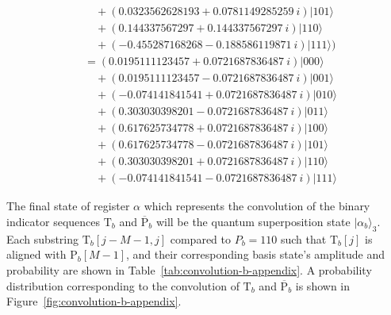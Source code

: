 \begin{example}
\begin{enumerate}
\begin{align*}
			& \quad + \left( 0.0323562628193 + 0.0781149285259\ i  \right) \vert 101 \rangle\\
			& \quad + \left( 0.144337567297 + 0.144337567297\ i \right) \vert 110 \rangle \\
			& \quad + \left( -0.455287168268 - 0.188586119871\ i \right) \vert 111 \rangle \Big)\\
			&= (0.0195111123457 + 0.0721687836487\ i ) \vert 000 \rangle \\
			& \quad + (0.0195111123457 - 0.0721687836487\ i) \vert 001 \rangle \\
			& \quad + (-0.074141841541 + 0.0721687836487\ i) \vert 010 \rangle \\
			& \quad + (0.303030398201 - 0.0721687836487\ i) \vert 011 \rangle \\
			& \quad + (0.617625734778 + 0.0721687836487\ i) \vert 100 \rangle \\
			& \quad + (0.617625734778 - 0.0721687836487\ i) \vert 101 \rangle \\
			& \quad + (0.303030398201 + 0.0721687836487\ i) \vert 110 \rangle \\
			& \quad + (-0.074141841541 - 0.0721687836487\ i) \vert 111 \rangle
		\end{align*}
\end{enumerate}
The final state of register $\alpha$ which represents the convolution of the binary indicator sequences $\text{T}_b$ and $\overline{\text{P}}_b$ will be the quantum superposition state $\vert \alpha_{b} \rangle_3$. Each substring $\text{T}_b [j-M-1,j]$ compared to $P_b = 110$ such that $\text{T}_b [j]$ is aligned with $\text{P}_b[M-1]$, and their corresponding basis state's amplitude and probability are shown in Table~\ref{tab:convolution-b-appendix}. A probability distribution corresponding to the convolution of $\text{T}_b$ and $\overline{\text{P}}_b$ is shown in Figure~\ref{fig:convolution-b-appendix}.


\end{example}
